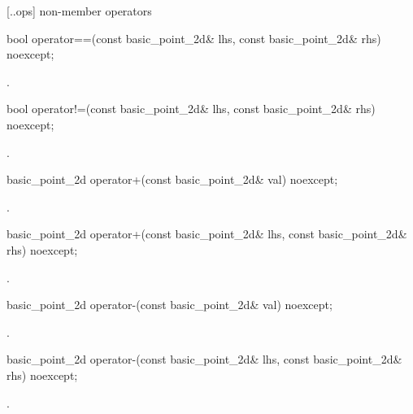  [\iotwod.\pointtwod.ops] { non-member operators}

%
\begin{itemdecl}
bool operator==(const basic_point_2d& lhs, const basic_point_2d& rhs) noexcept;
\end{itemdecl}
\begin{itemdescr}
\pnum \returns {}.
\end{itemdescr}

%
\begin{itemdecl}
bool operator!=(const basic_point_2d& lhs, const basic_point_2d& rhs) noexcept;
\end{itemdecl}
\begin{itemdescr}
\pnum \returns {}.
\end{itemdescr}

%
\begin{itemdecl}
basic_point_2d operator+(const basic_point_2d& val) noexcept;
\end{itemdecl}
\begin{itemdescr}
\pnum
\returns
{}.
\end{itemdescr}

%
\begin{itemdecl}
basic_point_2d operator+(const basic_point_2d& lhs, const basic_point_2d& rhs) noexcept;
\end{itemdecl}
\begin{itemdescr}
\pnum
\returns
{}.
\end{itemdescr}

%
\begin{itemdecl}
basic_point_2d operator-(const basic_point_2d& val) noexcept;
\end{itemdecl}
\begin{itemdescr}
\pnum
\returns
{}.
\end{itemdescr}

%
\begin{itemdecl}
basic_point_2d operator-(const basic_point_2d& lhs, const basic_point_2d& rhs) noexcept;
\end{itemdecl}
\begin{itemdescr}
\pnum
\returns
{}.
\end{itemdescr}

